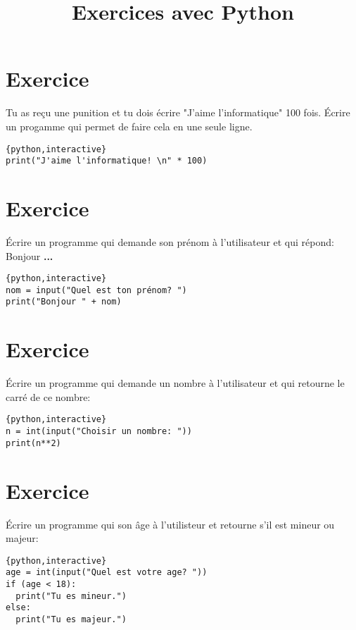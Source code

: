 \documentclass[a4paper,11pt]{article}
\begin{document}
\title{Exercices avec Python}
\date{}
\maketitle

\section{Exercice}
Tu as reçu une punition et tu dois écrire "J'aime l'informatique" 100 fois.
Écrire un progamme qui permet de faire cela en une seule ligne.
\begin{solution}
\begin{verbatim}{python,interactive}
print("J'aime l'informatique! \n" * 100)
\end{verbatim}
\end{solution}


\section{Exercice}
Écrire un programme qui demande son prénom à l'utilisateur et qui répond:\\
Bonjour \textbf{...}\\
\begin{solution}
\begin{verbatim}{python,interactive}
nom = input("Quel est ton prénom? ")
print("Bonjour " + nom)
\end{verbatim}
\end{solution}

\section{Exercice}
Écrire un programme qui demande un nombre à l'utilisateur et qui retourne le carré de ce nombre:\\
\begin{solution}
\begin{verbatim}{python,interactive}
n = int(input("Choisir un nombre: "))
print(n**2)
\end{verbatim}
\end{solution}

\section{Exercice}
Écrire un programme qui son âge à l'utilisteur et retourne s'il est mineur ou majeur:\\
\begin{solution}
\begin{verbatim}{python,interactive}
age = int(input("Quel est votre age? "))
if (age < 18):
  print("Tu es mineur.")
else:
  print("Tu es majeur.")
\end{verbatim}
\end{solution}
\end{document}
